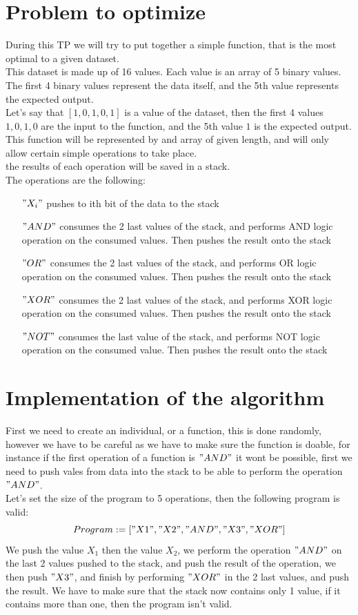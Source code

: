 \documentclass[a4paper]{article}
\begin{document}
\section{Problem to optimize}
During this TP we will try to put together a simple function, that is the most optimal to a given dataset.\\
This dataset is made up of 16 values. Each value is an array of 5 binary values. The first 4 binary values represent the data itself, and the 5th value represents the expected output.\\
Let's say that $[1,0,1,0,1]$ is a value of the dataset, then the first 4 values $1,0,1,0$ are the input to the function, and the 5th value $1$ is the expected output.\\
This function will be represented by and array of given length, and will only allow certain simple operations to take place.\\
the results of each operation will be saved in a stack.\\
The operations are the following:
\begin{itemize}
\item[$"X_i"$] pushes to ith bit of the data to the stack
\item[$"AND"$] consumes the 2 last values of the stack, and performs AND logic operation on the consumed values. Then pushes the result onto the stack
\item[$"OR"$] consumes the 2 last values of the stack, and performs OR logic operation on the consumed values. Then pushes the result onto the stack
\item[$"XOR"$] consumes the 2 last values of the stack, and performs XOR logic operation on the consumed values. Then pushes the result onto the stack
\item[$"NOT"$] consumes the last value of the stack, and performs NOT logic operation on the consumed value. Then pushes the result onto the stack
\end{itemize}

\section{Implementation of the algorithm}
First we need to create an individual, or a function, this is done randomly, however we have to be careful as we have to make sure the function is doable, for instance if the first operation of a function is $"AND"$ it wont be possible, first we need to push vales from data into the stack to be able to perform the operation $"AND"$.\\
Let's set the size of the program to 5 operations, then the following program is valid:\\
$$Program := ["X1", "X2", "AND", "X3", "XOR"]$$
We push the value $X_1$ then the value $X_2$, we perform the operation $"AND"$ on the last 2 values pushed to the stack, and push the result of the operation, we then push $"X3"$, and finish by performing $"XOR"$ in the 2 last values, and push the result. We have to make sure that the stack now contains only 1 value, if it contains more than one, then the program isn't valid.
\end{document}
